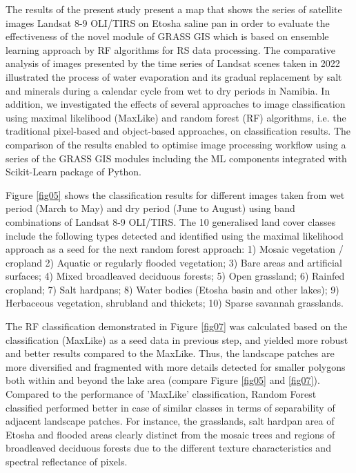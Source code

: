 \documentclass[climate,article,submit,pdftex,moreauthors]{Definitions/mdpi}
\begin{document}
The results of the present study present a map that shows the series of satellite images Landsat 8-9 OLI/TIRS on Etosha saline pan in order to evaluate the effectiveness of the novel module of GRASS GIS which is based on ensemble learning approach by RF algorithms for RS data processing. The comparative analysis of images presented by the time series of Landsat scenes taken in 2022 illustrated the process of water evaporation and its gradual replacement by salt and minerals during a calendar cycle from wet to dry periods in Namibia. In addition, we investigated the effects of several approaches to image classification using maximal likelihood (MaxLike) and random forest (RF) algorithms, i.e. the traditional pixel-based and object-based approaches, on classification results. The comparison of the results enabled to optimise image processing workflow using a series of the GRASS GIS modules including the ML components integrated with Scikit-Learn package of Python.

Figure \ref{fig05} shows the classification results for different images taken from wet period (March to May) and dry period (June to August) using band combinations of Landsat 8-9 OLI/TIRS. The 10 generalised land cover classes include the following types detected and identified using the maximal likelihood approach as a seed for the next random forest approach: 1) Mosaic vegetation / cropland 2) Aquatic or regularly flooded vegetation; 3) Bare areas and artificial surfaces; 4) Mixed broadleaved deciduous forests; 5) Open grassland; 6) Rainfed cropland; 7) Salt hardpans; 8) Water bodies (Etosha basin and other lakes); 9) Herbaceous vegetation, shrubland and thickets; 10) Sparse savannah grasslands. 

The RF classification demonstrated in Figure \ref{fig07} was calculated based on the classification (MaxLike) as a seed data in previous step, and yielded more robust and better results compared to the MaxLike. Thus, the landscape patches are more diversified and fragmented with more details detected for smaller polygons both within and beyond the lake area (compare Figure \ref{fig05} and \ref{fig07}). Compared to the performance of 'MaxLike' classification, Random Forest classified performed better in case of similar classes in terms of separability of adjacent landscape patches. For instance, the grasslands, salt hardpan area of Etosha and flooded areas clearly distinct from the mosaic trees and regions of broadleaved deciduous forests due to the different texture characteristics and spectral reflectance of pixels. 
\end{document}
